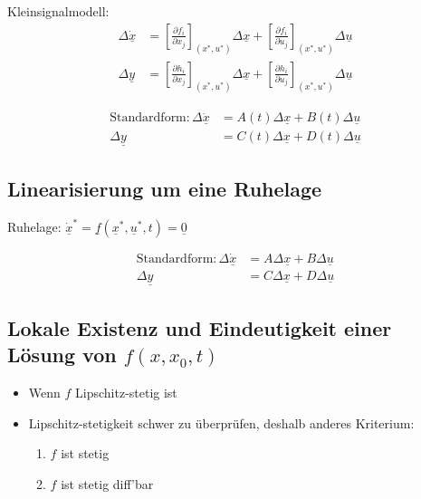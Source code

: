 \documentclass[german]{latex4ei/latex4ei_sheet}
\begin{document}
Kleinsignalmodell:
\begin{align*}
  \Delta \underline{\dot{x}}    &=  \left[ \frac{\partial f_i}{\partial x_j} \right]_{(x^*, u^*)} \Delta\underline{x} +
                                    \left[ \frac{\partial f_i}{\partial u_j} \right]_{(x^*, u^*)} \Delta\underline{u} \\
  \Delta \underline{{y}}        &=  \left[ \frac{\partial h_i}{\partial x_j} \right]_{(x^*, u^*)} \Delta\underline{x} +
                                    \left[ \frac{\partial h_i}{\partial u_j} \right]_{(x^*, u^*)} \Delta\underline{u}
\end{align*}

\begin{align*}
  \text{Standardform:} \,
  \Delta \underline{\dot{x}}    &=  A(t) \Delta\underline{x} + B(t) \Delta\underline{u} \\
  \Delta \underline{y}          &=  C(t) \Delta\underline{x} + D(t) \Delta\underline{u}
\end{align*}


\subsection{Linearisierung um eine Ruhelage}

Ruhelage: $\underline{\dot{x}}^* = \underline{f}\left( \underline{x}^*, \underline{u}^*, t \right) = \underline{0}$

\begin{align*}
  \text{Standardform:} \,
  \Delta \underline{\dot{x}}    &=  A \Delta\underline{x} + B \Delta\underline{u} \\
  \Delta \underline{y}          &=  C \Delta\underline{x} + D \Delta\underline{u}
\end{align*}


\subsection{Lokale Existenz und Eindeutigkeit einer Lösung von $f(x,x_0,t)$}

\begin{itemize}
  \item Wenn $f$ Lipschitz-stetig ist
  \item Lipschitz-stetigkeit schwer zu überprüfen, deshalb anderes Kriterium:
    \begin{enumerate}
      \item $f$ ist stetig
      \item $f$ ist stetig diff'bar
    \end{enumerate}
\end{itemize}
\end{document}
